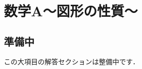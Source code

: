 \documentclass[../../ms_a.tex]{subfiles}
\begin{document}
\section{数学A～図形の性質～}

\subsection*{準備中}
この大項目の解答セクションは整備中です．
\end{document}
